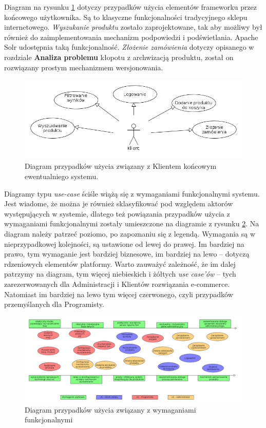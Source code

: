 Diagram na rysunku \ref{useCaseCustomer} dotyczy przypadków użycia elementów frameworku przez końcowego użytkownika. Są to klasyczne funkcjonalności tradycyjnego sklepu internetowego. \textit{Wyszukanie produktu} zostało zaprojektowane, tak aby możliwy był również do zaimplementowania mechanizm podpowiedzi i podświetlania. Apache Solr udostępnia taką funkcjonalność. \textit{Złożenie zamówienia} dotyczy opisanego w rozdziale \textbf{Analiza problemu} kłopotu z archwizacją produktu, został on rozwiązany prostym mechanizmem wersjonowania. 
\begin{figure}
	\begin{center}
		\includegraphics[width=1\textwidth]{uccustomer.png}
	\end{center}
	\caption{{\color{black}Diagram przypadków użycia związany z Klientem końcowym ewentualniego systemu.}} \label{useCaseCustomer}
\end{figure}

Diagramy typu \textit{use-case} ściśle wiążą się z wymaganiami funkcjonalnymi systemu. Jest wiadome, że można je również sklasyfikować pod względem aktorów występujących w systemie, dlatego też powiązania przypadków użycia z wymaganiami funkcjonalnymi zostały umieszczone na diagramie z rysunku \ref{wymtoUC}. Na diagram należy patrzeć poziomo, po zapoznaniu się z legendą. Wymagania są w nieprzypadkowej kolejności, są ustawione od lewej do prawej. Im bardziej na prawo, tym wymaganie jest bardziej biznesowe, im bardziej na lewo -- dotyczą rdzeniowych elementów platformy. Warto zauważyć zależność, że im dalej patrzymy na diagram, tym więcej niebieskich i żółtych \textit{use case'ów} -- tych zarezerwowanych dla Administracji i Klientów rozwiązania e-commerce. Natomiast im bardziej na lewo tym więcej czerwonego, czyli przypadków przemyślanych dla Programisty.
\begin{figure}
	\begin{center}
		\includegraphics[angle=270,scale=0.4]{wymToUC.png}
	\end{center}
	\caption{{\color{black}Diagram przypadków użycia związany z wymaganiami funkcjonalnymi}} \label{wymtoUC}
\end{figure}

